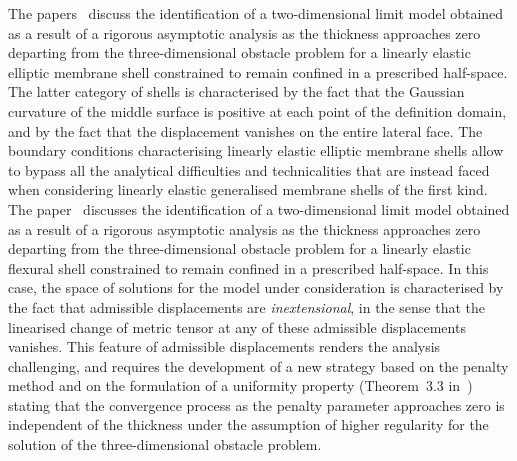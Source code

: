\documentclass{amsart}
\begin{document}
The papers~\cite{CiaMarPie2018b,CiaMarPie2018,PieJDE2022} discuss the identification of a two-dimensional limit model obtained as a result of a rigorous asymptotic analysis as the thickness approaches zero departing from the three-dimensional obstacle problem for a linearly elastic elliptic membrane shell constrained to remain confined in a prescribed half-space. The latter category of shells is characterised by the fact that the Gaussian curvature of the middle surface is positive at each point of the definition domain, and by the fact that the displacement vanishes on the entire lateral face. The boundary conditions characterising linearly elastic elliptic membrane shells allow to bypass all the analytical difficulties and technicalities that are instead faced when considering linearly elastic generalised membrane shells of the first kind.
The paper~\cite{Pie2023} discusses the identification of a two-dimensional limit model obtained as a result of a rigorous asymptotic analysis as the thickness approaches zero departing from the three-dimensional obstacle problem for a linearly elastic flexural shell constrained to remain confined in a prescribed half-space. In this case, the space of solutions for the model under consideration is characterised by the fact that admissible displacements are \emph{inextensional}, in the sense that the linearised change of metric tensor at any of these admissible displacements vanishes. This feature of admissible displacements renders the analysis challenging, and requires the development of a new strategy based on the penalty method and on the formulation of a uniformity property (Theorem~3.3 in~\cite{Pie2023}) stating that the convergence process as the penalty parameter approaches zero is independent of the thickness under the assumption of higher regularity for the solution of the three-dimensional obstacle problem.
\end{document}
